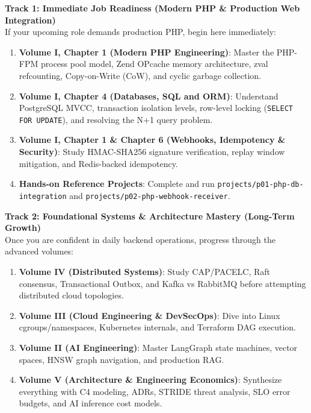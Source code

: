 \documentclass[11pt,oneside]{book}
\begin{document}
\begin{tcolorbox}[
  enhanced,
  colback=exampleBg,
  colframe=exampleBlue,
  arc=2pt,
  boxrule=0.8pt,
  left=12pt,right=12pt,top=10pt,bottom=10pt
]
\sffamily\small
\textbf{Track 1: Immediate Job Readiness (Modern PHP \& Production Web Integration)}\\
If your upcoming role demands production PHP, begin here immediately:
\begin{enumerate}[leftmargin=15pt]
  \item \textbf{Volume I, Chapter 1 (Modern PHP Engineering)}: Master the PHP-FPM process pool model, Zend OPcache memory architecture, zval refcounting, Copy-on-Write (CoW), and cyclic garbage collection.
  \item \textbf{Volume I, Chapter 4 (Databases, SQL and ORM)}: Understand PostgreSQL MVCC, transaction isolation levels, row-level locking (\texttt{SELECT FOR UPDATE}), and resolving the N+1 query problem.
  \item \textbf{Volume I, Chapter 1 \& Chapter 6 (Webhooks, Idempotency \& Security)}: Study HMAC-SHA256 signature verification, replay window mitigation, and Redis-backed idempotency.
  \item \textbf{Hands-on Reference Projects}: Complete and run \texttt{projects/p01-php-db-integration} and \texttt{projects/p02-php-webhook-receiver}.
\end{enumerate}
\end{tcolorbox}

\begin{tcolorbox}[
  enhanced,
  colback=hoodBg,
  colframe=hoodSlate,
  arc=2pt,
  boxrule=0.8pt,
  left=12pt,right=12pt,top=10pt,bottom=10pt
]
\sffamily\small
\textbf{Track 2: Foundational Systems \& Architecture Mastery (Long-Term Growth)}\\
Once you are confident in daily backend operations, progress through the advanced volumes:
\begin{enumerate}[leftmargin=15pt]
  \item \textbf{Volume IV (Distributed Systems)}: Study CAP/PACELC, Raft consensus, Transactional Outbox, and Kafka vs RabbitMQ before attempting distributed cloud topologies.
  \item \textbf{Volume III (Cloud Engineering \& DevSecOps)}: Dive into Linux cgroups/namespaces, Kubernetes internals, and Terraform DAG execution.
  \item \textbf{Volume II (AI Engineering)}: Master LangGraph state machines, vector spaces, HNSW graph navigation, and production RAG.
  \item \textbf{Volume V (Architecture \& Engineering Economics)}: Synthesize everything with C4 modeling, ADRs, STRIDE threat analysis, SLO error budgets, and AI inference cost models.
\end{enumerate}
\end{tcolorbox}
\end{document}

